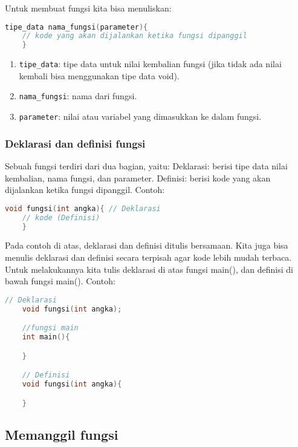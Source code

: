Untuk membuat fungsi kita bisa menuliskan:
{
\captionsetup[lstlisting]{labelformat=empty, justification=raggedright, singlelinecheck=false} %
\begin{lstlisting}[language=c, caption={syntax}]
    tipe_data nama_fungsi(parameter){
    // kode yang akan dijalankan ketika fungsi dipanggil
    }
\end{lstlisting}
}
\begin{enumerate}[label={}, leftmargin=*]
    \item \verb|tipe_data|: tipe data untuk nilai kembalian fungsi (jika tidak ada nilai kembali bisa menggunakan tipe data void).
    \item \verb|nama_fungsi|: nama dari fungsi.
    \item \verb|parameter|: nilai atau variabel yang dimasukkan ke dalam fungsi.
\end{enumerate}

\subsubsection{Deklarasi dan definisi fungsi}

Sebuah fungsi terdiri dari dua bagian, yaitu:
Deklarasi: berisi tipe data nilai kembalian, nama fungsi, dan parameter.
Definisi: berisi kode yang akan dijalankan ketika fungsi dipanggil.
Contoh:
\begin{lstlisting}[language=c]
	void fungsi(int angka){ // Deklarasi
	// kode (Definisi)
	}
\end{lstlisting}
Pada contoh di atas, deklarasi dan definisi ditulis bersamaan.
Kita juga bisa menulis deklarasi dan definisi secara terpisah agar kode lebih mudah terbaca.
Untuk melakukannya kita tulis deklarasi di atas fungsi main(), dan definisi di bawah fungsi main().
Contoh:
\begin{lstlisting}[language=c]
	// Deklarasi
	void fungsi(int angka);

	//fungsi main
	int main(){

	}

	// Definisi
	void fungsi(int angka){

	}
\end{lstlisting}

\subsection{Memanggil fungsi}

